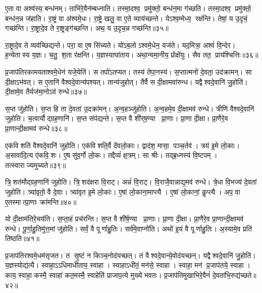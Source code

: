 ए॒ता वा अश्व॑स्य॒ बन्ध॑नम्। ताभि॑रे॒वैन॑म्बध्नाति। तस्मा॒दश्व॒ प्रमु॑क्तो॒ बन्ध॑न॒मा ग॑च्छति। तस्मा॒दश्व॒ प्रमु॑क्तो॒ बन्ध॑न॒न्न ज॑हाति। रा॒ष्ट्रं वा अ॑श्वमे॒धः। रा॒ष्ट्रे खलु॒ वा ए॒ते व्याय॑च्छन्ते। येऽश्व॒म्मेध्य॒ रक्ष॑न्ति। तेषां॒ य उ॒दृचं॒ गच्छ॑न्ति। रा॒ष्ट्रादे॒व ते रा॒ष्ट्रङ्ग॑च्छन्ति। अथ॒ य उ॒दृच॒न्न गच्छ॑न्ति॥३५॥

रा॒ष्ट्रादे॒व ते व्यव॑च्छिद्यन्ते। परा॒ वा ए॒ष सि॑च्यते। यो॑ऽब॒लोऽश्वमे॒धेन॒ यज॑ते। यद॒मित्रा॒ अश्वं॑ वि॒न्देर\sn{}। ह॒न्येतास्य य॒ज्ञः। च॒तु॒ श॒ता र॑क्षन्ति। य॒ज्ञस्याघा॑ताय। अथा॒न्यमा॒नीय॒ प्रोक्षे॑युः। सैव तत॒ प्राय॑श्चित्तिः॥३६॥\anuvakamend[ग॒च्छ॒ति॒ भ॒व॒त॒ प॒त्सु जु॑होति॒ न गच्छ॑न्ति॒ नव॑ च]

प्र॒जाप॑तिरकामयताश्वमे॒धेन॑ यजे॒येति॑। स तपो॑ऽतप्यत। तस्य॑ तेपा॒नस्य॑। स॒प्तात्मनो॑ दे॒वता॒ उद॑क्रामन्। सा दी॒क्षाऽभ॑वत्। स ए॒तानि॑ वैश्वदे॒वान्य॑पश्यत्। तान्य॑जुहोत्। तैर्वै स दी॒क्षामवा॑रुन्ध। यद्वैश्वदे॒वानि॑ जु॒होति॑। दी॒क्षामे॒व तैर्यज॑मा॒नोऽव॑ रुन्धे॥३७॥

स॒प्त जु॑होति। स॒प्त हि ता दे॒वता॑ उ॒दक्रा॑मन्। अ॒न्व॒हञ्जु॑होति। अ॒न्व॒हमे॒व दी॒क्षामव॑ रुन्धे। त्रीणि॑ वैश्वदे॒वानि॑ जुहोति। च॒त्वार्यौद्ग्रह॒णानि॑। स॒प्त संप॑द्यन्ते। स॒प्त वै शी॑र्‌ष॒ण्या प्रा॒णाः। प्रा॒णा दी॒क्षा। प्रा॒णैरे॒व प्रा॒णान्दी॒क्षामव॑ रुन्धे॥३८॥

एक॑विशतिं वैश्वदे॒वानि॑ जुहोति। एक॑विशति॒र्वै दे॑वलो॒काः। द्वाद॑श॒ मासा॒ पञ्च॒र्तव॑। त्रय॑ इ॒मे लो॒काः। अ॒सावा॑दि॒त्य ए॑कवि॒शः। ए॒ष सु॑व॒र्गो लो॒कः। तद्दैव्यं॑ क्ष॒त्रम्। सा श्रीः। तद्ब्र॒ध्नस्य॑ वि॒ष्टपम्। तत्स्वाराज्यमुच्यते॥३९॥

त्रि॒शत॑मौद्ग्रह॒णानि॑ जुहोति। त्रि॒शद॑क्षरा वि॒राट्। अन्नं॑ वि॒राट्। वि॒राजै॒वान्नाद्य॒मव॑ रुन्धे। त्रे॒धा वि॒भज्य॑ दे॒वतां जुहोति। त्र्या॑वृतो॒ वै दे॒वाः। त्र्या॑वृत इ॒मे लो॒काः। ए॒षां लो॒काना॒माप्त्यै। ए॒षां लो॒कानां॒ कॢप्त्यै। अप॒ वा ए॒तस्मात्प्रा॒णाः क्रा॑मन्ति॥४०॥

यो दी॒क्षाम॑तिरे॒चय॑ति। स॒प्ता॒हं प्रच॑रन्ति। स॒प्त वै शी॑र्\mbox{}ष॒ण्या प्रा॒णाः। प्रा॒णा दी॒क्षा। प्रा॒णैरे॒व प्रा॒णान्दी॒क्षामव॑ रुन्धे। पू॒र्णा॒हु॒तिमु॑त्त॒मां जु॑होति। सर्वं॒ वै पूर्णाहु॒तिः। सर्व॑मे॒वाप्नो॑ति। अथो॑ इ॒यं वै पूर्णाहु॒तिः। अ॒स्यामे॒व प्रति॑ तिष्ठति॥४१॥\anuvakamend[रु॒न्धे॒ प्रा॒णान्दी॒क्षामव॑ रुन्ध उच्यते क्रामन्ति तिष्ठति]

प्र॒जाप॑तिरश्वमे॒धम॑सृजत। त सृ॒ष्टं न किञ्च॒नोद॑यच्छत्। तं वैश्वदे॒वान्ये॒वोद॑यच्छन्। यद्वैश्वदे॒वानि॑ जु॒होति॑। य॒ज्ञस्योद्य॑त्यै। स्वाहा॒ऽऽधिमाधी॑ताय॒ स्वाहा। स्वाहाऽधी॑तं॒ मन॑से॒ स्वाहा। स्वाहा॒ मन॑ प्र॒जाप॑तये॒ स्वाहा। काय॒ स्वाहा॒ कस्मै॒ स्वाहा॑ कत॒मस्मै॒ स्वाहेति॑ प्राजाप॒त्ये मुख्ये॑ भवतः। प्र॒जाप॑तिमुखाभिरे॒वैनं॑ दे॒वता॑भि॒रुद्य॑च्छते॥४२॥

